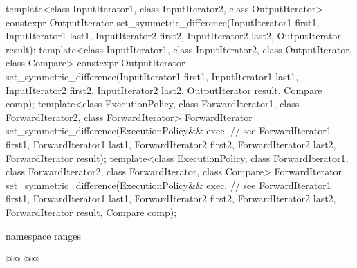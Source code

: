 \begin{codeblock}
  template<class InputIterator1, class InputIterator2, class OutputIterator>
    constexpr OutputIterator
      set_symmetric_difference(InputIterator1 first1, InputIterator1 last1,
                               InputIterator2 first2, InputIterator2 last2,
                               OutputIterator result);
  template<class InputIterator1, class InputIterator2, class OutputIterator, class Compare>
    constexpr OutputIterator
      set_symmetric_difference(InputIterator1 first1, InputIterator1 last1,
                               InputIterator2 first2, InputIterator2 last2,
                               OutputIterator result, Compare comp);
  template<class ExecutionPolicy, class ForwardIterator1, class ForwardIterator2,
           class ForwardIterator>
    ForwardIterator
      set_symmetric_difference(ExecutionPolicy&& exec, // see 
                               ForwardIterator1 first1, ForwardIterator1 last1,
                               ForwardIterator2 first2, ForwardIterator2 last2,
                               ForwardIterator result);
  template<class ExecutionPolicy, class ForwardIterator1, class ForwardIterator2,
           class ForwardIterator, class Compare>
    ForwardIterator
      set_symmetric_difference(ExecutionPolicy&& exec, // see 
                               ForwardIterator1 first1, ForwardIterator1 last1,
                               ForwardIterator2 first2, ForwardIterator2 last2,
                               ForwardIterator result, Compare comp);
\end{codeblock}\begin{addedblock}\begin{codeblock}
  namespace ranges {
    @@
    @@

}
\end{codeblock}
\end{addedblock}
